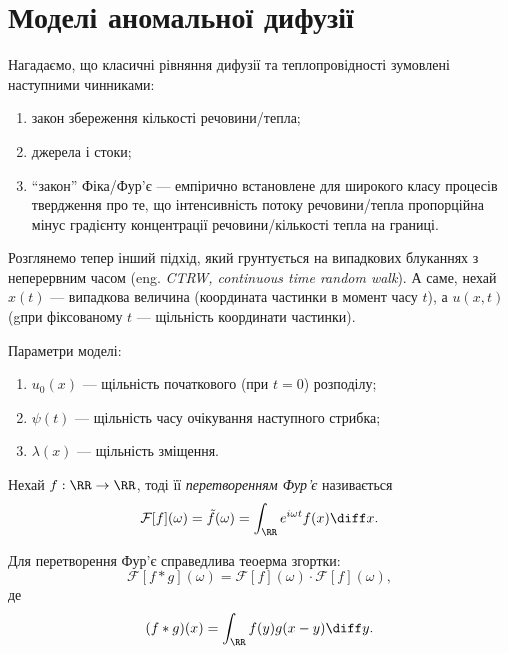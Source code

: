 \section{Моделі аномальної дифузії}


Нагадаємо, що класичні рівняння дифузії та теплопровідності зумовлені наступними чинниками:
\begin{enumerate}
    \item закон збереження кількості речовини/тепла;
    \item джерела і стоки;
    \item ``закон'' Фіка/Фур'є --- емпірично встановлене для широкого класу процесів твердження про те, що інтенсивність потоку речовини/тепла пропорційна мінус градієнту концентрації речовини/кількості тепла на границі.
\end{enumerate}

Розглянемо тепер інший підхід, який грунтується на випадкових блуканнях з неперервним часом (eng. \textit{CTRW, continuous time random walk}). А саме, нехай $x(t)$ --- випадкова величина (координата частинки в момент часу $t$), а  $u(x, t)$ (gпри фіксованому $t$ --- щільність координати частинки). \medskip


Параметри моделі:
\begin{enumerate}
    \item $u_0(x)$ --- щільність початкового (при $t = 0$) розподілу;
    \item $\psi(t)$ --- щільність часу очікування наступного стрибка;
    \item $\lambda(x)$ --- щільність зміщення.
\end{enumerate}

\begin{definition}
    Нехай $f: \RR \to \RR$, тоді її \textit{перетворенням Фур'є} називається 
    \begin{equation}
        \mathcal{F}[f](\omega) = \tilde{f}(\omega) = \int_\RR e^{i \omega t} f(x) \diff x.
    \end{equation}
\end{definition}

\begin{proposition}
    Для перетворення Фур'є справедлива теоерма згортки:
    \begin{equation}
        \mathcal{F}[f * g](\omega) = \mathcal{F}[f](\omega) \cdot \mathcal{F}[f](\omega),
    \end{equation}
    де
    \begin{equation}
        (f * g)(x) = \int_\RR f(y) g(x - y) \diff y.
    \end{equation}
\end{proposition}

